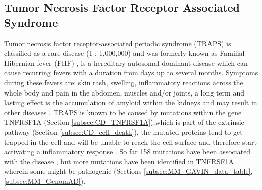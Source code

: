 %
%
%
%
%
%
%
\label{subsec:CD_cell_death}

\subsection{Tumor Necrosis Factor Receptor Associated Syndrome}
Tumor necrosis factor receptor-associated periodic syndrome (TRAPS) is classified as a rare disease (1 : 1,000,000) and was formerly known as Familial Hibernian fever (FHF) \cite{}, is a hereditary autosomal dominant disease which can cause recurring fevers with a duration from days up to several months. Symptoms during these fevers are: skin rash, swelling, inflammatory reactions across the whole body and pain in the abdomen, muscles and/or joints, a long term and lasting effect is the accumulation of amyloid within the kidneys and may result in other diseases \cite{}. 
TRAPS is known to be caused by mutations within the gene TNFRSF1A (Section \ref{subsec:CD_TNFRSF1A}),which is part of the extrinsic pathway (Section \ref{subsec:CD_cell_death}), the mutated proteins tend to get trapped in the cell and will be unable to reach the cell surface and therefore start activating a inflammatory response \cite{}.
So far 158 mutations have been associated with the disease \cite{}, but more mutations have been identified in TNFRSF1A wherein some might be pathogenic (Sections \ref{subsec:MM_GAVIN_data_table}, \ref{subsec:MM_GenomAD}).
\label{subsec:CD_TRAPS}

